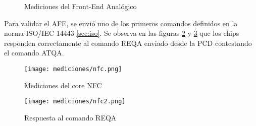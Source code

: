 \begin{figure}[H]
\caption{Mediciones del Front-End Analógico}

\label{fig:med_afe}
\end{figure}

Para validar el AFE, se envió uno de los primeros comandos definidos en la norma ISO/IEC 14443 \ref{sec:iso}. Se observa en las figuras \ref{fig:digital_nfc} y \ref{fig:digital_nfc2} que los chips responden correctamente al comando REQA enviado desde la PCD contestando el comando ATQA.


\begin{figure}[H]
\centering
\texttt{[image: mediciones/nfc.png]}
\caption{Mediciones del core NFC}
\label{fig:digital_nfc}
\end{figure}

\begin{figure}[H]
\centering
\texttt{[image: mediciones/nfc2.png]}
\caption{Respuesta al comando REQA}
\label{fig:digital_nfc2}
\end{figure}